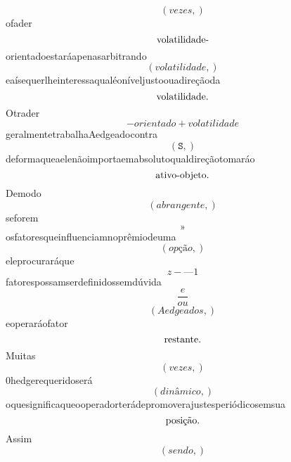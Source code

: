 \documentclass{article}
\begin{document}
\begin{equation}
\left( vezes,\right)
\end{equation}ofader\begin{equation}
$volatilidade-$
\end{equation}orientadoestaráapenasarbitrando\begin{equation}
\left( volatilidade,\right)
\end{equation}eaísequerlheinteressaqualéoníveljustoouadireçãoda\begin{equation}
$volatilidade.$
\end{equation}Otrader\begin{equation}
- orientado + volatilidade
\end{equation}geralmentetrabalhaAedgeadocontra\begin{equation}
\left( \mathtt{\text{S}},\right)
\end{equation}deformaqueaelenãoimportaemabsolutoqualdireçãotomaráo\begin{equation}
$ativo-objeto.$
\end{equation}Demodo\begin{equation}
\left( abrangente,\right)
\end{equation}seforem\begin{equation}
»
\end{equation}osfatoresqueinfluenciamnoprêmiodeuma\begin{equation}
\left( opção,\right)
\end{equation}eleprocuraráque\begin{equation}
z - —1
\end{equation}fatorespossamserdefinidossemdúvida\begin{equation}
\frac{e}{ou}
\end{equation}\begin{equation}
\left( Aedgeados,\right)
\end{equation}eoperaráofator\begin{equation}
$restante.$
\end{equation}Muitas\begin{equation}
\left( vezes,\right)
\end{equation}0hedgerequeridoserá\begin{equation}
\left( dinâmico,\right)
\end{equation}oquesignificaqueooperadorterádepromoverajustesperiódicosemsua\begin{equation}
$posição.$
\end{equation}Assim\begin{equation}
\left( sendo,\right)

\end{equation}
\end{document}
